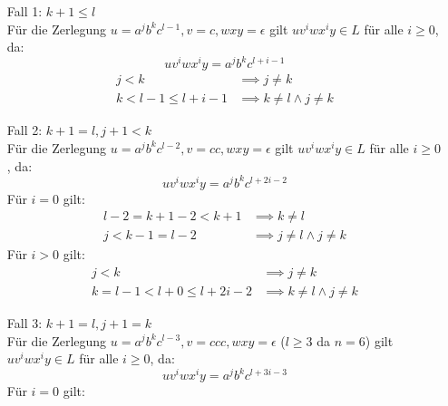 \documentclass[]{article}
\begin{document}
\begin{itemize}
\item[Fall 1:]$k+1\leq l$\\
F\"ur die Zerlegung $u=a^jb^kc^{l-1},v=c,wxy=\epsilon$ gilt $uv^iwx^iy\in L$ f\"ur alle $i\geq0$, da:
$$uv^iwx^iy=a^jb^kc^{l+i-1}$$
\begin{align*}
j<k &\implies j \neq k\\
k<l-1\leq l+i-1 &\implies k\neq l \wedge j\neq k
\end{align*}
\item[Fall 2:]$k+1=l,j+1<k$\\
F\"ur die Zerlegung $u=a^jb^kc^{l-2},v=cc,wxy=\epsilon$ gilt $uv^iwx^iy\in L$ f\"ur alle $i\geq0$, da:
$$uv^iwx^iy=a^jb^kc^{l+2i-2}$$
F\"ur $i=0$ gilt:
\begin{align*}
l-2=k+1-2<k+1 &\implies k\neq l\\
j<k-1=l-2 &\implies j\neq l \wedge j\neq k
\end{align*}
F\"ur $i>0$ gilt:
\begin{align*}
j<k &\implies j \neq k\\
k=l-1<l+0\leq l+2i-2 &\implies k\neq l \wedge j\neq k
\end{align*}
\item[Fall 3:]$k+1=l, j+1=k$\\
F\"ur die Zerlegung $u=a^jb^kc^{l-3},v=ccc,wxy=\epsilon$ ($l\geq3$ da $n=6$) gilt $uv^iwx^iy\in L$ f\"ur alle $i\geq0$, da:
$$uv^iwx^iy=a^jb^kc^{l+3i-3}$$
F\"ur $i=0$ gilt:

\end{itemize}
\end{document}
